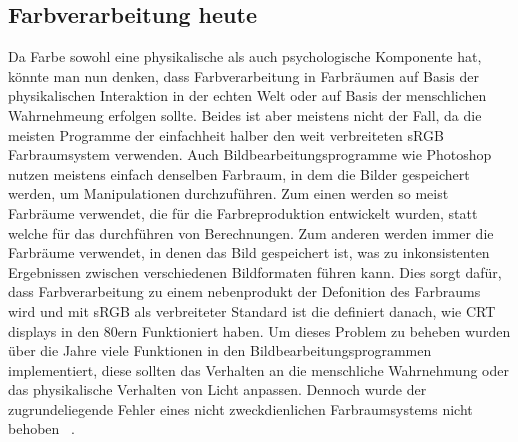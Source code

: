 \documentclass[12pt, a4paper, ngerman]{article}
\begin{document}
\subsection{Farbverarbeitung heute}
Da Farbe sowohl eine physikalische als auch psychologische Komponente hat, könnte man nun denken, 
dass Farbverarbeitung in Farbräumen auf Basis der physikalischen Interaktion in der echten Welt oder 
auf Basis der menschlichen Wahrnehmeung erfolgen sollte.
Beides ist aber meistens nicht der Fall, da die meisten Programme der einfachheit halber den weit verbreiteten sRGB Farbraumsystem verwenden.
Auch Bildbearbeitungsprogramme wie Photoshop nutzen meistens einfach denselben Farbraum, 
in dem die Bilder gespeichert werden, um Manipulationen durchzuführen. 
Zum einen werden so meist Farbräume verwendet, die für die Farbreproduktion entwickelt wurden, 
statt welche für das durchführen von Berechnungen.
Zum anderen werden immer die Farbräume verwendet, in denen das Bild gespeichert ist, 
was zu inkonsistenten Ergebnissen zwischen verschiedenen Bildformaten führen kann.
Dies sorgt dafür, dass Farbverarbeitung zu einem nebenprodukt der Defonition des Farbraums wird und 
mit sRGB als verbreiteter Standard ist die definiert danach, wie CRT displays in den 80ern Funktioniert haben.
Um dieses Problem zu beheben wurden über die Jahre viele Funktionen in den Bildbearbeitungsprogrammen implementiert, 
diese sollten das Verhalten an die menschliche Wahrnehmung oder das physikalische Verhalten von Licht anpassen. 
Dennoch wurde der zugrundeliegende Fehler eines nicht zweckdienlichen Farbraumsystems nicht behoben ~\cite{Ottosson_2020}.
\end{document}
